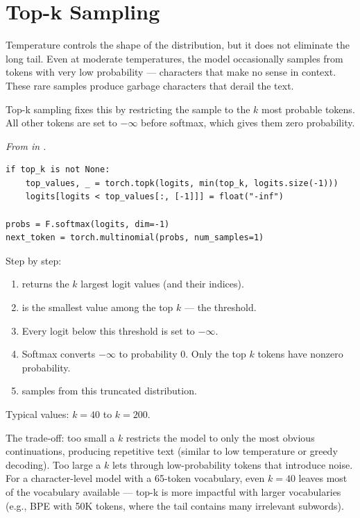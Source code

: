 \section{Top-k Sampling}

Temperature controls the shape of the distribution, but it does not eliminate the long tail. Even at moderate temperatures, the model occasionally samples from tokens with very low probability --- characters that make no sense in context. These rare samples produce garbage characters that derail the text.

Top-k sampling fixes this by restricting the sample to the $k$ most probable tokens. All other tokens are set to $-\infty$ before softmax, which gives them zero probability.

\concepttag
{\small\itshape From  in .}
\begin{lstlisting}
if top_k is not None:
    top_values, _ = torch.topk(logits, min(top_k, logits.size(-1)))
    logits[logits < top_values[:, [-1]]] = float("-inf")

probs = F.softmax(logits, dim=-1)
next_token = torch.multinomial(probs, num_samples=1)
\end{lstlisting}

Step by step:

\begin{enumerate}
  \item {} returns the $k$ largest logit values (and their indices).
  \item {} is the smallest value among the top $k$ --- the threshold.
  \item Every logit below this threshold is set to $-\infty$.
  \item Softmax converts $-\infty$ to probability 0. Only the top $k$ tokens have nonzero probability.
  \item {} samples from this truncated distribution.
\end{enumerate}

Typical values: $k = 40$ to $k = 200$.

The trade-off: too small a $k$ restricts the model to only the most obvious continuations, producing repetitive text (similar to low temperature or greedy decoding). Too large a $k$ lets through low-probability tokens that introduce noise. For a character-level model with a 65-token vocabulary, even $k = 40$ leaves most of the vocabulary available --- top-k is more impactful with larger vocabularies (e.g., BPE with 50K tokens, where the tail contains many irrelevant subwords).

